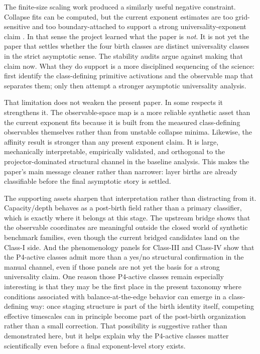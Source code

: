 \documentclass[11pt]{article}
\begin{document}
The finite-size scaling work produced a similarly useful negative constraint. Collapse fits can be computed, but the current exponent estimates are too grid-sensitive and too boundary-attached to support a strong universality-exponent claim \cite{fisher_barber_1972,binder_1981_prl,ardourel_bangu_2023}. In that sense the project learned what the paper is \emph{not}. It is not yet the paper that settles whether the four birth classes are distinct universality classes in the strict asymptotic sense. The stability audits argue against making that claim now. What they do support is a more disciplined sequencing of the science: first identify the class-defining primitive activations and the observable map that separates them; only then attempt a stronger asymptotic universality analysis.

That limitation does not weaken the present paper. In some respects it strengthens it. The observable-space map is a more reliable synthetic asset than the current exponent fits because it is built from the measured class-defining observables themselves rather than from unstable collapse minima. Likewise, the affinity result is stronger than any present exponent claim. It is large, mechanically interpretable, empirically validated, and orthogonal to the projector-dominated structural channel in the baseline analysis. This makes the paper's main message cleaner rather than narrower: layer births are already classifiable before the final asymptotic story is settled.

The supporting assets sharpen that interpretation rather than distracting from it. Capacity/depth behaves as a post-birth field rather than a primary classifier, which is exactly where it belongs at this stage. The upstream bridge shows that the observable coordinates are meaningful outside the closed world of synthetic benchmark families, even though the current bridged candidates land on the Class-I side. And the phenomenology panels for Class-III and Class-IV show that the P4-active classes admit more than a yes/no structural confirmation in the manual channel, even if those panels are not yet the basis for a strong universality claim.
One reason those P4-active classes remain especially interesting is that they may be the first place in the present taxonomy where conditions associated with balance-at-the-edge behavior can emerge in a class-defining way: once staging structure is part of the birth identity itself, competing effective timescales can in principle become part of the post-birth organization rather than a small correction. That possibility is suggestive rather than demonstrated here, but it helps explain why the P4-active classes matter scientifically even before a final exponent-level story exists.
\end{document}
